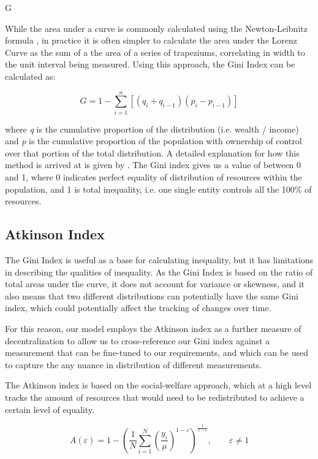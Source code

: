 G\documentclass[conference]{IEEEtran}
\begin{document}
While the area under a curve is commonly calculated using the Newton-Leibnitz formula \cite{kalinski2016}, in practice it is often simpler to calculate the area under the Lorenz Curve as the sum of a the area of a series of trapeziums, correlating in width to the unit interval being measured.  Using this approach, the Gini Index can be calculated as:

\[G=1-\sum_{i=1}^{n}\left[ \left( q_{i}+q_{i-1} \right) \left( p_{i}-p_{i-1} \right) \right]\]

where \textit{q} is the cumulative proportion of the distribution (i.e. wealth / income) and \textit{p} is the cumulative proportion of the population with ownership of control over that portion of the total distribution.  A detailed explanation for how this method is arrived at is given by \cite{bellu2006inequality}.
The Gini index gives us a value of between 0 and 1, where 0 indicates perfect equality of distribution of resources within the population, and 1 is total inequality, i.e. one single entity controls all the 100\% of resources.

\subsection{Atkinson Index}

The Gini Index is useful as a base for calculating inequality, but it has limitations in describing the qualities of inequality.  As the Gini Index is based on the ratio of total areas under the curve, it does not account for variance or skewness, and it also means that two different distributions can potentially have the same Gini index, which could potentially affect the tracking of changes over time.

For this reason, our model employs the Atkinson index \cite{atkinson1970measurement} as a further measure of decentralization to allow us to cross-reference our Gini index against a measurement that can be fine-tuned to our requirements, and which can be used to capture the any nuance in distribution of different measurements.

The Atkinson index is based on the social-welfare approach, which at a high level tracks the amount of resources that would need to be redistributed to achieve a certain level of equality.

\[A(\varepsilon) = 1 - \left(\frac{1}{N} \sum_{i=1}^{N} \left(\frac{y_i}{\mu}\right)^{1 - \varepsilon}\right)^{\frac{1}{1 - \varepsilon}}, \quad \quad \varepsilon \neq 1
\]
\end{document}
